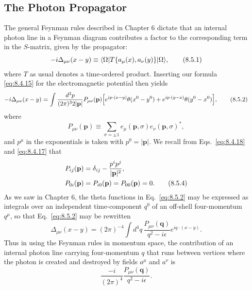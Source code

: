 
\subsection{The Photon Propagator}

The general Feynman rules described in Chapter 6 dictate that an internal
photon line in a Feynman diagram contributes a factor to the corresponding
term in the $S$-matrix, given by the propagator:
\begin{equation}
-i\Delta_{\mu\nu}(x-y)
\equiv\langle \Omega\rvert T\{a_\mu(x),a_\nu(y)\}\lvert \Omega\rangle,
\tag{8.5.1}\label{eq:8.5.1}
\end{equation}
where $T$ as usual denotes a time-ordered product. Inserting our formula
\eqref{eq:8.4.15} for the electromagnetic potential then yields
\begin{align}
-i\Delta_{\mu\nu}(x-y)
=\int\frac{d^3p}{(2\pi)^3 2\lvert\mathbf p\rvert}
P_{\mu\nu}(\mathbf p)\Bigl[
e^{ip\cdot(x-y)}\theta(x^0-y^0)
+e^{ip\cdot(y-x)}\theta(y^0-x^0)\Bigr],
\tag{8.5.2}\label{eq:8.5.2}
\end{align}
where
\begin{equation}
P_{\mu\nu}(\mathbf p)
\equiv\sum_{\sigma=\pm1}
e_\mu(\mathbf p,\sigma)e_\nu(\mathbf p,\sigma)^*,
\tag{8.5.3}\label{eq:8.5.3}
\end{equation}
and $p^\mu$ in the exponentials is taken with
$p^0=\lvert\mathbf p\rvert$. We recall from Eqs.~\eqref{eq:8.4.18} and \eqref{eq:8.4.17} that
\begin{align}
P_{ij}(\mathbf p)&=\delta_{ij}-\frac{p^i p^j}{\lvert\mathbf p\rvert^2},
\notag\\
P_{0i}(\mathbf p)&=P_{i0}(\mathbf p)=P_{00}(\mathbf p)=0.
\tag{8.5.4}\label{eq:8.5.4}
\end{align}
As we saw in Chapter 6, the theta functions in Eq.~\eqref{eq:8.5.2} may be expressed as
integrals over an independent time-component $q^0$ of an off-shell
four-momentum $q^\mu$, so that Eq.~\eqref{eq:8.5.2} may be rewritten
\begin{equation}
\Delta_{\mu\nu}(x-y)=(2\pi)^{-4}\int d^4q\,
\frac{P_{\mu\nu}(\mathbf q)}{q^2-i\epsilon}
e^{iq\cdot(x-y)}.
\tag{8.5.5}\label{eq:8.5.5}
\end{equation}
Thus in using the Feynman rules in momentum space, the contribution of an
internal photon line carrying four-momentum $q$ that runs between vertices
where the photon is created and destroyed by fields $a^\mu$ and $a^\nu$ is
\begin{equation}
\frac{-i}{(2\pi)^4}\frac{P_{\mu\nu}(\mathbf q)}{q^2-i\epsilon}.
\tag{8.5.6}\label{eq:8.5.6}
\end{equation}

